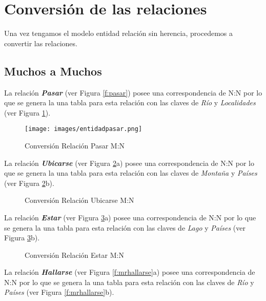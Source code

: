 \documentclass[letter,12pt]{report}
\begin{document}
\section{Conversión de las relaciones}\label{s:mrdescripcion}


Una vez tengamos el modelo entidad relación sin herencia, procedemos a convertir las relaciones.

\subsection{Muchos a Muchos}
La relación \textbf{\textit{Pasar}} (ver Figura \ref{f:pasar}) posee una correspondencia de N:N por lo que se genera la una tabla para esta relación con las claves de \textit{Río} y \textit{Localidades} (ver Figura \ref{f:mrpasar}).

\begin{figure}[H]
\centering
\texttt{[image: images/entidadpasar.png]}
\caption{Conversión Relación Pasar M:N} 
\label{f:mrpasar}
\end{figure}


La relación \textbf{\textit{Ubicarse}} (ver Figura \ref{f:mrubicarse}a) posee una correspondencia de N:N por lo que se genera la una tabla para esta relación con las claves de \textit{Montaña} y \textit{Países} (ver Figura \ref{f:mrubicarse}b).

\begin{figure}[H]
\centering
{}
\caption{Conversión Relación Ubicarse M:N} \label{f:mrubicarse}
\end{figure}

La relación \textbf{\textit{Estar}} (ver Figura \ref{f:mrestar}a) posee una correspondencia de N:N por lo que se genera la una tabla para esta relación con las claves de \textit{Lago} y \textit{Países} (ver Figura \ref{f:mrestar}b).

\begin{figure}[H]
\centering
{}
\caption{Conversión Relación Estar M:N} \label{f:mrestar}
\end{figure}

La relación \textbf{\textit{Hallarse}} (ver Figura \ref{f:mrhallarse}a) posee una correspondencia de N:N por lo que se genera la una tabla para esta relación con las claves de \textit{Río} y \textit{Países} (ver Figura \ref{f:mrhallarse}b).
\end{document}
